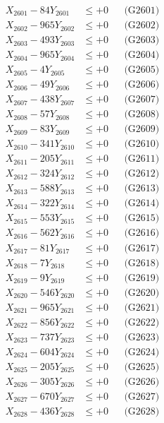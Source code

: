 \documentclass[a4paper,10pt]{article}
\begin{document}
{\begin{align}
\allowbreak
X_{2601} - 84Y_{2601} &\leq +0 && \text{(G2601)} \\
X_{2602} - 965Y_{2602} &\leq +0 && \text{(G2602)} \\
X_{2603} - 493Y_{2603} &\leq +0 && \text{(G2603)} \\
X_{2604} - 965Y_{2604} &\leq +0 && \text{(G2604)} \\
X_{2605} - 4Y_{2605} &\leq +0 && \text{(G2605)} \\
X_{2606} - 49Y_{2606} &\leq +0 && \text{(G2606)} \\
X_{2607} - 438Y_{2607} &\leq +0 && \text{(G2607)} \\
X_{2608} - 57Y_{2608} &\leq +0 && \text{(G2608)} \\
X_{2609} - 83Y_{2609} &\leq +0 && \text{(G2609)} \\
X_{2610} - 341Y_{2610} &\leq +0 && \text{(G2610)} \\
\allowbreak
X_{2611} - 205Y_{2611} &\leq +0 && \text{(G2611)} \\
X_{2612} - 324Y_{2612} &\leq +0 && \text{(G2612)} \\
X_{2613} - 588Y_{2613} &\leq +0 && \text{(G2613)} \\
X_{2614} - 322Y_{2614} &\leq +0 && \text{(G2614)} \\
X_{2615} - 553Y_{2615} &\leq +0 && \text{(G2615)} \\
X_{2616} - 562Y_{2616} &\leq +0 && \text{(G2616)} \\
X_{2617} - 81Y_{2617} &\leq +0 && \text{(G2617)} \\
X_{2618} - 7Y_{2618} &\leq +0 && \text{(G2618)} \\
X_{2619} - 9Y_{2619} &\leq +0 && \text{(G2619)} \\
X_{2620} - 546Y_{2620} &\leq +0 && \text{(G2620)} \\
\allowbreak
X_{2621} - 965Y_{2621} &\leq +0 && \text{(G2621)} \\
X_{2622} - 856Y_{2622} &\leq +0 && \text{(G2622)} \\
X_{2623} - 737Y_{2623} &\leq +0 && \text{(G2623)} \\
X_{2624} - 604Y_{2624} &\leq +0 && \text{(G2624)} \\
X_{2625} - 205Y_{2625} &\leq +0 && \text{(G2625)} \\
X_{2626} - 305Y_{2626} &\leq +0 && \text{(G2626)} \\
X_{2627} - 670Y_{2627} &\leq +0 && \text{(G2627)} \\
X_{2628} - 436Y_{2628} &\leq +0 && \text{(G2628)} \\

\end{align}}
\end{document}
